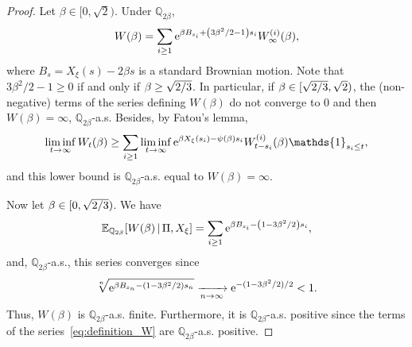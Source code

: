 \documentclass[AHL,Unicode,longabstracts,published]{cedram}
\newcommand{\e}{\mathrm{e}}
\newcommand{\E}{\mathbb{E}}
\newcommand{\Q}{\mathbb{Q}}
\newcommand\1{\mathds{1}}
\let\originalleft\left
\let\originalright\right
\renewcommand{\left}{\mathopen{}\mathclose\bgroup\originalleft}
\renewcommand{\right}{\aftergroup\egroup\originalright}
\renewcommand*{\to}{\mathchoice{\longrightarrow}{\rightarrow}{\rightarrow}{\rightarrow}}
\begin{document}
\begin{proof}
Let $\beta \in [0,\sqrt{2})$. Under $\Q_{2\beta}$,
\begin{equation*}
W(\beta) = \sum_{i \geq 1} \e^{\beta B_{s_i} + \left(3\beta^2/2 - 1\right) s_i} W_\infty^{(i)}(\beta),
\end{equation*}
where $B_s = X_\xi(s) - 2 \beta s$ is a standard Brownian motion. Note that $3\beta^2/2 - 1 \geq 0$ if and only if $\beta \geq \sqrt{2\smash{/}3}$. In particular, if $\beta \in [\sqrt{2\smash{/}3}, \sqrt{2})$, the (non-negative) terms of the series defining $W(\beta)$ do not converge to $0$ and then $W(\beta) = \infty$, $\Q_{2\beta}$-a.s. Besides, by Fatou's lemma,
\begin{equation*}
\liminf_{t \to \infty} W_t(\beta) \geq \sum_{i \geq 1} \liminf_{t \to \infty} \e^{\beta X_\xi(s_i) - \psi(\beta)s_i} W_{t - s_i}^{(i)}(\beta) \1_{s_i \leq t},
\end{equation*}
and this lower bound is $\Q_{2\beta}$-a.s. equal to $W(\beta) = \infty$.

Now let $\beta \in [0, \sqrt{2\smash{/}3})$. We have
\begin{equation}\label{eq:W(beta)_finite}
\E_{\Q_{2\beta}} \left[W(\beta) \,\middle|\, \Pi, X_\xi \right] = \sum_{i \geq 1} \e^{\beta B_{s_i} - \left(1 - 3\beta^2/2\right) s_i},
\end{equation}
and, $\Q_{2\beta}$-a.s., this series converges since
\begin{equation*}
\sqrt[n]{\e^{\beta B_{s_n} - (1 - 3\beta^2/2) s_n}} \xrightarrow[n \to \infty]{} \e^{-(1 - 3\beta^2/2)/2} < 1.
\end{equation*}
Thus, $W(\beta)$ is $\Q_{2\beta}$-a.s. finite. Furthermore, it is $\Q_{2\beta}$-a.s. positive since the terms of the series~\eqref{eq:definition_W} are $\Q_{2\beta}$-a.s. positive.


\end{proof}
\end{document}
